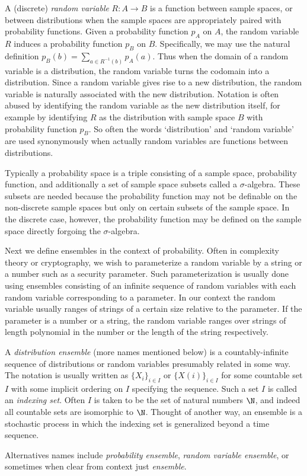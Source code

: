 A (discrete) \emph{random variable} $R\colon A\to B$ is a function between sample spaces, or between distributions when the sample spaces are appropriately paired with probability functions.
Given a probability function $p_A$ on $A$, the random variable $R$ induces a probability function $p_B$ on $B$.
Specifically, we may use the natural definition $p_B(b) = \sum_{a\in R^{-1}(b)} p_A(a)$.
Thus when the domain of a random variable is a distribution, the random variable turns the codomain into a distribution.
Since a random variable gives rise to a new distribution, the random variable is naturally associated with the new distribution.
Notation is often abused by identifying the random variable as the new distribution itself, for example by identifying $R$ as the distribution with sample space $B$ with probability function $p_B$.
So often the words `distribution' and `random variable' are used synonymously when actually random variables are functions between distributions.

\begin{remark}
    Typically a probability space is a triple consisting of a sample space, probability function, and additionally a set of sample space subsets called a $\sigma$-algebra.
    These subsets are needed because the probability function may not be definable on the non-discrete sample spaces but only on certain subsets of the sample space.
    In the discrete case, however, the probability function may be defined on the sample space directly forgoing the $\sigma$-algebra.
\end{remark}

Next we define ensembles in the context of probability.
Often in complexity theory or cryptography, we wish to parameterize a random variable by a string or a number such as a security parameter.
Such parameterization is usually done using ensembles consisting of an infinite sequence of random variables with each random variable corresponding to a parameter.
In our context the random variable usually ranges of strings of a certain size relative to the parameter.
If the parameter is a number or a string, the random variable ranges over strings of length polynomial in the number or the length of the string respectively.

\begin{definition}
    A \emph{distribution ensemble} (more names mentioned below) is a countably-infinite sequence of distributions or random variables presumably related in some way.
    The notation is usually written as $\{X_i\}_{i\in I}$ or $\{X(i)\}_{i\in I}$ for some countable set $I$ with some implicit ordering on $I$ specifying the sequence.
    Such a set $I$ is called an \emph{indexing set}.
    Often $I$ is taken to be the set of natural numbers $\N$, and indeed all countable sets are isomorphic to $\N$.
    Thought of another way, an ensemble is a stochastic process in which the indexing set is generalized beyond a time sequence.

    Alternatives names include \emph{probability ensemble}, \emph{random variable ensemble}, or sometimes when clear from context just \emph{ensemble}.
\end{definition}

